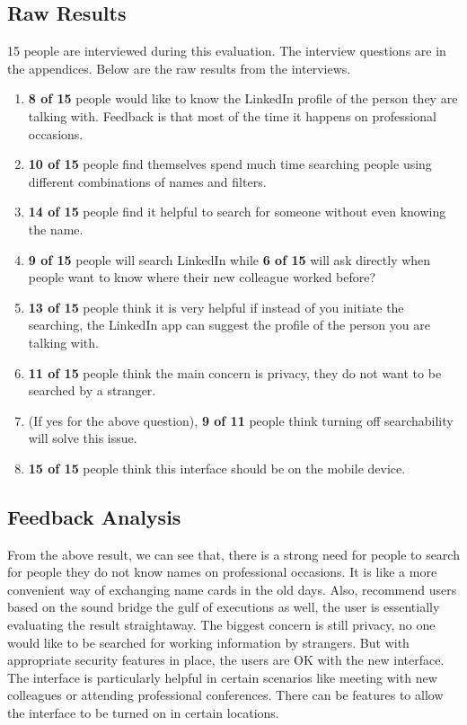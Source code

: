 \documentclass[
	letterpaper, %
]{jdf}
\begin{document}
\subsection{Raw Results}
15 people are interviewed during this evaluation. The interview questions are in the appendices. Below are the raw results from the interviews.
\begin{enumerate}
    \item \textbf{8 of 15} people would like to know the LinkedIn profile of the person they are talking with. Feedback is that most of the time it happens on professional occasions.
    \item \textbf{10 of 15} people find themselves spend much time searching people using different combinations of names and filters.
    \item \textbf{14 of 15} people find it helpful to search for someone without even knowing the name.
    \item \textbf{9 of 15} people will search LinkedIn while \textbf{6 of 15} will ask directly when people want to know where their new colleague worked before?
    \item \textbf{13 of 15} people think it is very helpful if instead of you initiate the searching, the LinkedIn app can suggest the profile of the person you are talking with.
    \item \textbf{11 of 15} people think the main concern is privacy, they do not want to be searched by a stranger.
    \item (If yes for the above question), \textbf{9 of 11} people think turning off searchability will solve this issue.
    \item \textbf{15 of 15} people think this interface should be on the mobile device.
\end{enumerate}

\subsection{Feedback Analysis}
From the above result, we can see that, there is a strong need for people to search for people they do not know names on professional occasions. It is like a more convenient way of exchanging name cards in the old days. Also, recommend users based on the sound bridge the gulf of executions as well, the user is essentially evaluating the result straightaway. The biggest concern is still privacy, no one would like to be searched for working information by strangers. But with appropriate security features in place, the users are OK with the new interface. The interface is particularly helpful in certain scenarios like meeting with new colleagues or attending professional conferences. There can be features to allow the interface to be turned on in certain locations.
\end{document}
